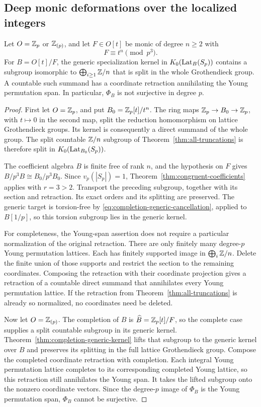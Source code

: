 \subsection{Deep monic deformations over the localized integers}

\begin{corollary}\label{cor:deep-monogenic-orders}
Let $O=\mathbb Z_p$ or $\mathbb Z_{(p)}$, and let $F\in O[t]$ be monic of
degree $n\ge2$ with
\[
 F\equiv t^n\pmod {p^3}.
\]
For $B=O[t]/F$, the generic specialization kernel in
$K_0(\operatorname{Lat}_B(S_p))$ contains a subgroup isomorphic to
$\bigoplus_{i\ge1}\mathbb Z/n$ that is split in the whole Grothendieck
group.  A countable such summand has a coordinate retraction
annihilating the Young permutation span.  In particular,
$\Phi_B$ is not surjective in degree $p$.
\end{corollary}

\begin{proof}
First let $O=\mathbb Z_p$, and put $B_0=\mathbb Z_p[t]/t^n$.
The ring maps $\mathbb Z_p\to B_0\to\mathbb Z_p$, with $t\mapsto0$ in the
second map, split the reduction homomorphism on lattice
Grothendieck groups.  Its kernel is consequently a direct summand
of the whole group.  The split countable $\mathbb Z/n$ subgroup of
Theorem~\ref{thm:all-truncations} is therefore split in
$K_0(\operatorname{Lat}_{B_0}(S_p))$.

The coefficient algebra $B$ is finite free of rank $n$, and the
hypothesis on $F$ gives $B/p^3B\cong B_0/p^3B_0$.
Since $v_p(|S_p|)=1$, Theorem~\ref{thm:congruent-coefficients}
applies with $r=3>2$.  Transport the preceding subgroup,
together with its section and retraction.  Its exact orders
and its splitting are preserved.  The generic target is torsion-free
by \eqref{eq:completion-generic-cancellation}, applied to
$B[1/p]$, so this torsion subgroup lies in the generic kernel.

For completeness, the Young-span assertion does not require a
particular normalization of the original retraction.  There are
only finitely many degree-$p$ Young permutation lattices.  Each
has finitely supported image in $\bigoplus_i\mathbb Z/n$.  Delete the
finite union of those supports and restrict the section to the
remaining coordinates.  Composing the retraction with their
coordinate projection gives a retraction of a countable direct
summand that annihilates every Young permutation lattice.
If the retraction from Theorem~\ref{thm:all-truncations} is already
so normalized, no coordinates need be deleted.

Now let $O=\mathbb Z_{(p)}$.  The completion of $B$ is
$\widehat B=\mathbb Z_p[t]/F$, so the complete case supplies a split
countable subgroup in its generic kernel.
Theorem~\ref{thm:completion-generic-kernel} lifts that subgroup
to the generic kernel over $B$ and preserves its splitting in
the full lattice Grothendieck group.  Compose the completed
coordinate retraction with completion.  Each integral Young
permutation lattice completes to its corresponding completed
Young lattice, so this retraction still annihilates the Young
span.  It takes the lifted subgroup onto the nonzero coordinate
vectors.  Since the degree-$p$ image of $\Phi_B$ is the Young
permutation span, $\Phi_B$ cannot be surjective.
\end{proof}

